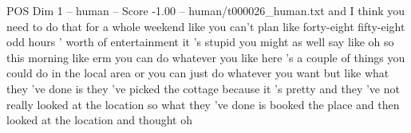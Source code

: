 \begin{textsample}{POS Dim 1 – human – Score -1.00 – human/t000026\_human.txt}  \label{ex:f1_pos_016}
and I think you need to do that for a whole weekend like you can't plan like forty-eight fifty-eight odd hours ' worth of entertainment it 's stupid you might as well say like oh so this morning like erm you can do whatever you like here 's a couple of things you could do in the local area or you can just do whatever you want but like what they 've done is they 've picked the cottage because it 's pretty and they 've not really looked at the location so what they 've done is booked the place and then looked at the location and thought oh

\end{textsample}
